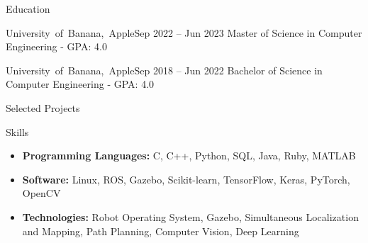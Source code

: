 \documentclass[]{../mcdowellcv}
\begin{document}
\makeheader

\begin{cvsection}{Education}

    \begin{cvsubsection}{\mbox {University of Banana, Apple}}{}{Sep 2022 -- Jun 2023}
        Master of Science in Computer Engineering - GPA: 4.0
    \end{cvsubsection}
    
    \begin{cvsubsection}{\mbox {University of Banana, Apple}}{}{Sep 2018 -- Jun 2022}
        Bachelor of Science in Computer Engineering - GPA: 4.0
    \end{cvsubsection}
    
\end{cvsection}


\begin{cvsection}{Selected Projects}

\end{cvsection}

\begin{cvsection}{Skills}

    \begin{cvsubsection}{}{}{}
        \begin{itemize}
            \item \textbf{Programming Languages:} C, C++, Python, SQL, Java, Ruby, MATLAB
            \item \textbf{Software:} Linux, ROS, Gazebo, Scikit-learn, TensorFlow, Keras, PyTorch, OpenCV
            \item \textbf{Technologies:} Robot Operating System, Gazebo, Simultaneous Localization and Mapping, Path Planning, Computer Vision, Deep Learning
        \end{itemize}
    \end{cvsubsection}

\end{cvsection}
\end{document}
